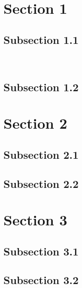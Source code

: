 \documentclass{hus}
\begin{document}
\cleardoublepage{}

\tableofcontents
\pagebreak

\listoffigures
\pagebreak

\cleardoublepage{}


\section{Section 1}

\subsection{Subsection 1.1}

~\cite{texbook}~\cite{latex:companion}~\cite{latex2e}~\cite{knuth:1984}

\subsection{Subsection 1.2}


\newpage %
\section{Section 2}

\subsection{Subsection 2.1}

\subsection{Subsection 2.2}


\newpage %
\section{Section 3}

\subsection{Subsection 3.1}

\subsection{Subsection 3.2}


\pagebreak


\end{document}
